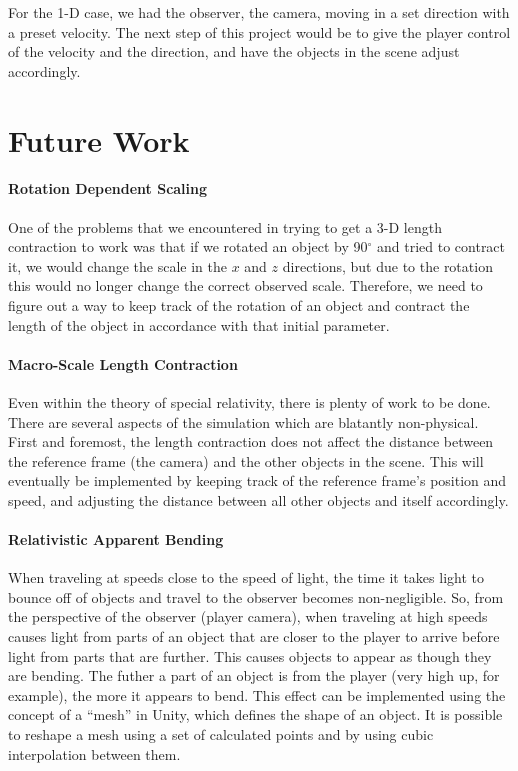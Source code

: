 \documentclass[12pt]{article}
\begin{document}
For the 1-D case, we had the observer, the camera, moving in a set direction with a preset velocity. The next step of this project would be to give the player control of the velocity and the direction, and have the objects in the scene adjust accordingly.

\section{Future Work}

\paragraph{Rotation Dependent Scaling} 
One of the problems that we encountered in trying to get a 3-D length contraction to work was that if we rotated an object by 90$^\circ$ and tried to contract it, we would change the scale in the $x$ and $z$ directions, but due to the rotation this would no longer change the correct observed scale. Therefore, we need to figure out a way to keep track of the rotation of an object and contract the length of the object in accordance with that initial parameter. 

\paragraph{Macro-Scale Length Contraction}
Even within the theory of special relativity, there is plenty of work to be done. There are several aspects of the simulation which are blatantly non-physical. First and foremost, the length contraction does not affect the distance between the reference frame (the camera) and the other objects in the scene. This will eventually be implemented by keeping track of the reference frame's position and speed, and adjusting the distance between all other objects and itself accordingly.

\paragraph{Relativistic Apparent Bending}
When traveling at speeds close to the speed of light, the time it takes light to bounce off of objects and travel to the observer becomes non-negligible. So, from the perspective of the observer (player camera), when traveling at high speeds causes light from parts of an object that are closer to the player to arrive before light from parts that are further. This causes objects to appear as though they are bending. The futher a part of an object is from the player (very high up, for example), the more it appears to bend. This effect can be implemented using the concept of a \enquote{mesh} in Unity, which defines the shape of an object. It is possible to reshape a mesh using a set of calculated points and by using cubic interpolation between them.
\end{document}
